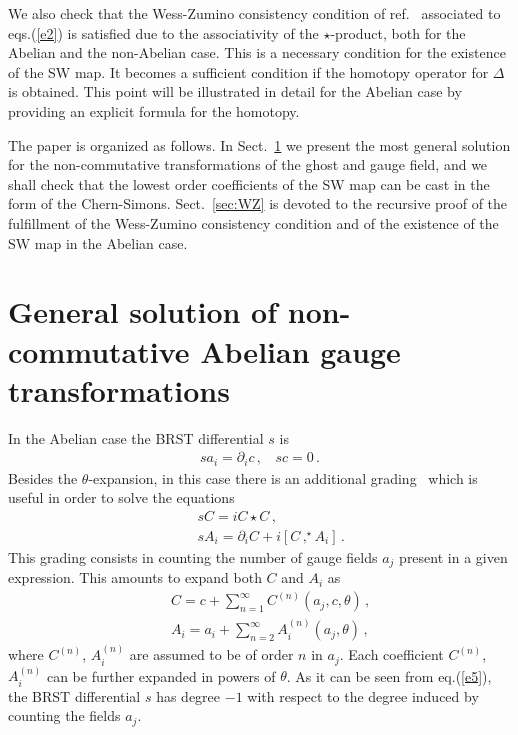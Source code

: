 \documentclass[a4paper,12pt]{article}
\newcommand{\starcomm}[2]{[ #1 \, ,^{\!\!\star} #2 ]}
\begin{document}
We also check that the Wess-Zumino consistency condition of 
 ref.~\cite{Brace:2001fj} associated to eqs.(\ref{e2})
 is  satisfied due to  the associativity of the $\star$-product,
 both for the Abelian and the non-Abelian case.
This is a necessary condition for the existence of the SW map.
It becomes a sufficient condition if the homotopy operator for $\Delta$ is
 obtained. 
This point will be illustrated in detail for the Abelian case by providing an
 explicit formula for the homotopy.

The paper is organized as follows. In Sect.~\ref{2} we present the most general
 solution for the non-commutative transformations of the ghost and gauge field,
 and we shall check that the lowest order coefficients of the SW map can be
 cast in the form of the Chern-Simons.
Sect.~\ref{sec:WZ} is devoted to the recursive proof of the fulfillment of the
 Wess-Zumino consistency condition and of the existence of the SW map in the
 Abelian case.

\section{General solution of non-commutative Abelian gauge transformations}
\label{2}

In the Abelian case the BRST differential $s$ is 
%
\begin{eqnarray}
s a_i = \partial_i c \, , ~~~~ s c =0  \,.
\label{e5}
\end{eqnarray}
% 
Besides the $\theta$-expansion, in this  case there is an 
 additional grading~\cite{Okuyama:2001sw}   
 which is useful in order to solve the equations
%
\begin{subequations}\label{e6}
\begin{eqnarray}
&& s C = i C \star C \, , \label{e6.1}\\
&& s A_i = \partial_i C + i \starcomm{C}{A_i} \, .\label{e6.2}
\end{eqnarray}
\end{subequations}
%
This grading consists in counting the number of gauge fields  $a_j$ present
 in a given expression.
This amounts to expand both $C$ and $A_i$ as 
%
\begin{subequations}\label{7}
\begin{eqnarray}
&& C = c + \sum_{n=1}^\infty C^{(n)}(a_j,c,\theta) \, , \\
&& A_i = a_i + \sum_{n=2}^\infty A^{(n)}_i(a_j,\theta) \, ,
\label{e7}
\end{eqnarray}
\end{subequations}
%
where $C^{(n)}$, $A_i^{(n)}$ are assumed to be of order $n$ in $a_j$.
Each coefficient $C^{(n)}$, $A_i^{(n)}$ can be further expanded 
 in powers of $\theta$.
As it can be seen from eq.(\ref{e5}), the BRST differential $s$ has degree
 $-1$ with respect to the degree induced by counting the fields $a_j$.
\end{document}
